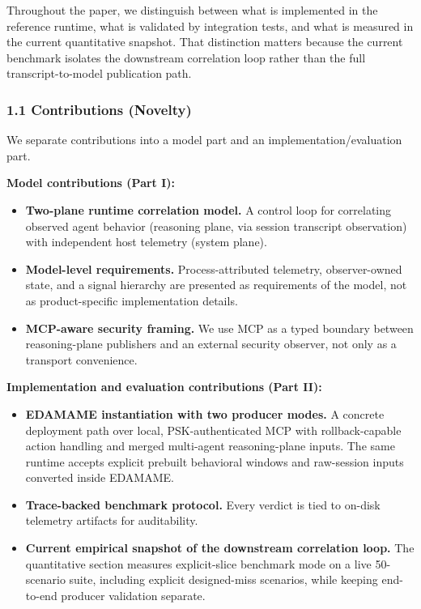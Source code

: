 \documentclass[
]{article}
\providecommand{\tightlist}{%
  \setlength{\itemsep}{0pt}\setlength{\parskip}{0pt}}
\begin{document}
Throughout the paper, we distinguish between what is implemented in the
reference runtime, what is validated by integration tests, and what is
measured in the current quantitative snapshot. That distinction matters
because the current benchmark isolates the downstream correlation loop
rather than the full transcript-to-model publication path.

\subsubsection{1.1 Contributions (Novelty)}\label{contributions-novelty}

We separate contributions into a model part and an
implementation/evaluation part.

\textbf{Model contributions (Part I):}

\begin{itemize}
\tightlist
\item
  \textbf{Two-plane runtime correlation model.} A control loop for
  correlating observed agent behavior (reasoning plane, via session
  transcript observation) with independent host telemetry (system
  plane).
\item
  \textbf{Model-level requirements.} Process-attributed telemetry,
  observer-owned state, and a signal hierarchy are presented as
  requirements of the model, not as product-specific implementation
  details.
\item
  \textbf{MCP-aware security framing.} We use MCP as a typed boundary
  between reasoning-plane publishers and an external security observer,
  not only as a transport convenience.
\end{itemize}

\textbf{Implementation and evaluation contributions (Part II):}

\begin{itemize}
\tightlist
\item
  \textbf{EDAMAME instantiation with two producer modes.} A concrete
  deployment path over local, PSK-authenticated MCP with
  rollback-capable action handling and merged multi-agent
  reasoning-plane inputs. The same runtime accepts explicit prebuilt
  behavioral windows and raw-session inputs converted inside EDAMAME.
\item
  \textbf{Trace-backed benchmark protocol.} Every verdict is tied to
  on-disk telemetry artifacts for auditability.
\item
  \textbf{Current empirical snapshot of the downstream correlation
  loop.} The quantitative section measures explicit-slice benchmark mode
  on a live 50-scenario suite, including explicit designed-miss
  scenarios, while keeping end-to-end producer validation separate.
\end{itemize}
\end{document}
